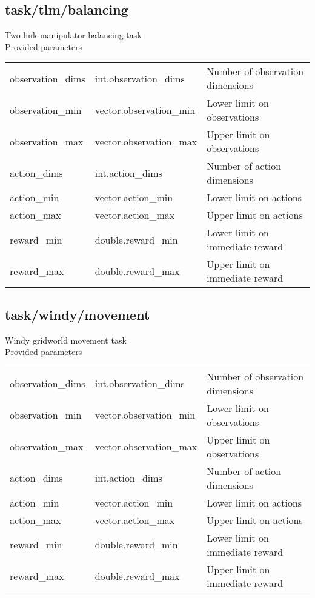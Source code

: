 \subsection{task/tlm/balancing}
\noindent Two-link manipulator balancing task\\

\noindent Provided parameters\\

\noindent\begin{tabular}{@{}lll@{}}
observation\_dims&int.observation\_dims&Number of observation dimensions\\
observation\_min&vector.observation\_min&Lower limit on observations\\
observation\_max&vector.observation\_max&Upper limit on observations\\
action\_dims&int.action\_dims&Number of action dimensions\\
action\_min&vector.action\_min&Lower limit on actions\\
action\_max&vector.action\_max&Upper limit on actions\\
reward\_min&double.reward\_min&Lower limit on immediate reward\\
reward\_max&double.reward\_max&Upper limit on immediate reward\\
\end{tabular}
\subsection{task/windy/movement}
\noindent Windy gridworld movement task\\

\noindent Provided parameters\\

\noindent\begin{tabular}{@{}lll@{}}
observation\_dims&int.observation\_dims&Number of observation dimensions\\
observation\_min&vector.observation\_min&Lower limit on observations\\
observation\_max&vector.observation\_max&Upper limit on observations\\
action\_dims&int.action\_dims&Number of action dimensions\\
action\_min&vector.action\_min&Lower limit on actions\\
action\_max&vector.action\_max&Upper limit on actions\\
reward\_min&double.reward\_min&Lower limit on immediate reward\\
reward\_max&double.reward\_max&Upper limit on immediate reward\\
\end{tabular}
